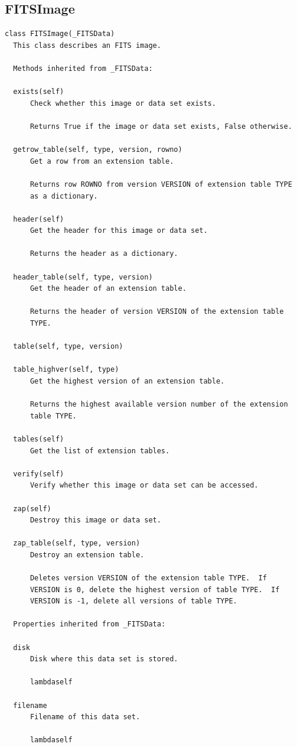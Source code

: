 \documentclass[11pt]{report}
\begin{document}
\subsection{FITSImage}
\begin{verbatim}
class FITSImage(_FITSData)
  This class describes an FITS image.
  
  Methods inherited from _FITSData:
  
  exists(self)
      Check whether this image or data set exists.
      
      Returns True if the image or data set exists, False otherwise.
  
  getrow_table(self, type, version, rowno)
      Get a row from an extension table.
      
      Returns row ROWNO from version VERSION of extension table TYPE
      as a dictionary.
  
  header(self)
      Get the header for this image or data set.
      
      Returns the header as a dictionary.
  
  header_table(self, type, version)
      Get the header of an extension table.
      
      Returns the header of version VERSION of the extension table
      TYPE.
  
  table(self, type, version)
  
  table_highver(self, type)
      Get the highest version of an extension table.
      
      Returns the highest available version number of the extension
      table TYPE.
  
  tables(self)
      Get the list of extension tables.
  
  verify(self)
      Verify whether this image or data set can be accessed.
  
  zap(self)
      Destroy this image or data set.
  
  zap_table(self, type, version)
      Destroy an extension table.
      
      Deletes version VERSION of the extension table TYPE.  If
      VERSION is 0, delete the highest version of table TYPE.  If
      VERSION is -1, delete all versions of table TYPE.
  
  Properties inherited from _FITSData:
  
  disk
      Disk where this data set is stored.
  
      lambdaself
  
  filename
      Filename of this data set.
  
      lambdaself
\end{verbatim}
\end{document}
